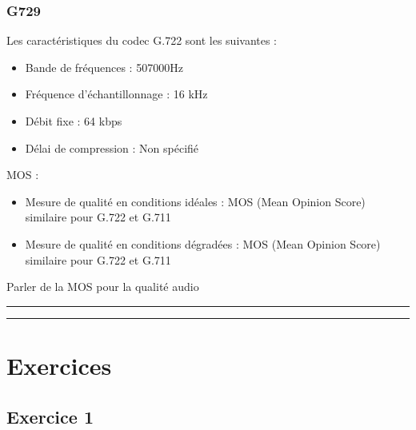 \documentclass[letterpaper,10pt,french]{sphinxmanual}
\begin{document}
\sphinxAtStartPar


\noindent{}

\sphinxAtStartPar



\subsubsection{G729}
\label{\detokenize{Documentation-M362:g729}}
\noindent{}

\sphinxAtStartPar
Les caractéristiques du codec G.722 sont les suivantes :
\begin{itemize}
\item {} 
\sphinxAtStartPar
Bande de fréquences : 50\sphinxhyphen{}7000Hz

\item {} 
\sphinxAtStartPar
Fréquence d’échantillonnage : 16 kHz

\item {} 
\sphinxAtStartPar
Débit fixe : 64 kbps

\item {} 
\sphinxAtStartPar
Délai de compression : Non spécifié

\end{itemize}

\sphinxAtStartPar
MOS :
\begin{itemize}
\item {} 
\sphinxAtStartPar
Mesure de qualité en conditions idéales : MOS (Mean Opinion Score) similaire pour G.722 et G.711

\item {} 
\sphinxAtStartPar
Mesure de qualité en conditions dégradées : MOS (Mean Opinion Score) similaire pour G.722 et G.711

\end{itemize}

\sphinxAtStartPar
Parler de la MOS pour la qualité audio


\bigskip\hrule\bigskip



\bigskip\hrule\bigskip



\section{Exercices}
\label{\detokenize{Documentation-M362:exercices}}

\subsection{Exercice 1}
\label{\detokenize{Documentation-M362:exercice-1}}
\end{document}
